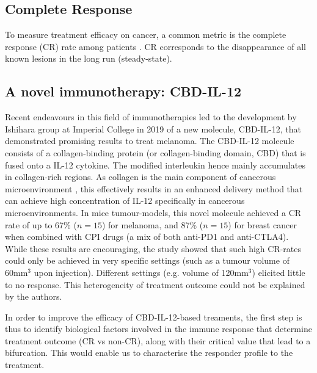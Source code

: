 \documentclass[11pt]{article}
\begin{document}
\subsection{Complete Response}
To measure treatment efficacy on cancer, a common metric is the complete response (CR) rate among patients \cite{cancMetric}. CR corresponds to the disappearance of all known lesions \cite{CRDef} in the long run (steady-state).

\subsection{A novel immunotherapy: CBD-IL-12}
Recent endeavours in this field of immunotherapies led to the development by Ishihara group at Imperial College in 2019 \cite{cbdil12} of a new molecule, CBD-IL-12, that demonstrated promising results to treat melanoma. The CBD-IL-12  molecule consists of a collagen-binding protein (or collagen-binding domain, CBD) that is fused onto a IL-12 cytokine. The modified interleukin hence mainly accumulates in collagen-rich regions. As collagen is the main component of cancerous microenvironment \cite{collagenInCancer}, this effectively results in an enhanced delivery method that can achieve high concentration of IL-12 specifically in cancerous microenvironments. In mice tumour-models, this novel molecule achieved a CR rate of up to 67\% ($n=15$) for melanoma, and 87\% ($n=15$) for breast cancer when combined with CPI drugs (a mix of both anti-PD1 and anti-CTLA4). While these results are encouraging, the study showed that such high CR-rates could only be achieved in very specific settings (such as a tumour volume of 60mm$^3$ upon injection). Different settings (e.g. volume of 120mm$^3$) elicited little to no response. This heterogeneity of treatment outcome could not be explained by the authors.

In order to improve the efficacy of CBD-IL-12-based treaments, the first step is thus to identify biological factors involved in the immune response that determine treatment outcome (CR vs non-CR), along with their critical value that lead to a bifurcation. This would enable us to characterise the responder profile to the treatment.
\end{document}
